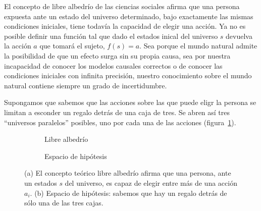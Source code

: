 \documentclass[a4paper,10pt]{book}
\theoremstyle{definition}
\begin{document}

El concepto de libre albedrío de las ciencias sociales afirma que una persona expuesta ante un estado del universo determinado, bajo exactamente las mismas condiciones iniciales, tiene todavía la capacidad de elegir una acción.
%
Ya no es posible definir una función tal que dado el estados inical del universo $s$ devuelva la acción $a$ que tomará el sujeto, $f(s) = a$.
%
Sea porque el mundo natural admite la posibilidad de que un efecto surga sin su propia causa, sea por nuestra incapacidad de conocer los modelos causales correctos o de conocer las condiciones iniciales con infinita precisión, nuestro conocimiento sobre el mundo natural contiene siempre un grado de incertidumbre.


Supongamos que sabemos que las acciones sobre las que puede eligr la persona se limitan a esconder un regalo detrás de una caja de tres.
%
Se abren así tres ``universos paralelos'' posibles, uno por cada una de las acciones (figura~\ref{fig:libre_albedrio}).
%
\begin{figure}[ht!]
\centering
\begin{subfigure}[b]{0.48\textwidth}
\centering
    \caption{Libre albedrío}
    \label{fig:libre_albedrio}
\end{subfigure}
\begin{subfigure}[b]{0.48\textwidth}
 \centering
   \caption{Espacio de hipótesis}
   \label{fig:espacio_de_hipotesis}
\end{subfigure}
    \caption{(a) El concepto teórico libre albedrío afirma que una persona, ante un estados $s$ del universo, es capaz de elegir entre más de una acción $a_i$.
    (b) Espacio de hipótesis: sabemos que hay un regalo detrás de sólo una de las tres cajas. }
\end{figure}
\end{document}
